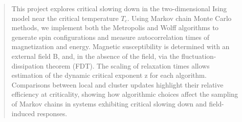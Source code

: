\begin{abstract}
This project explores critical slowing down in the two-dimensional Ising model near the critical temperature $T_c$. Using Markov chain Monte Carlo methods, we implement both the Metropolis and Wolff algorithms to generate spin configurations and measure autocorrelation times of magnetization and energy. Magnetic susceptibility is determined with an external field B, and, in the absence of the field, via the fluctuation-dissipation theorem (FDT). The scaling of relaxation times allows estimation of the dynamic critical exponent z for each algorithm. Comparisons between local and cluster updates highlight their relative efficiency at criticality, showing how algorithmic choices affect the sampling of Markov chains in systems exhibiting critical slowing down and field-induced responses.
\end{abstract}